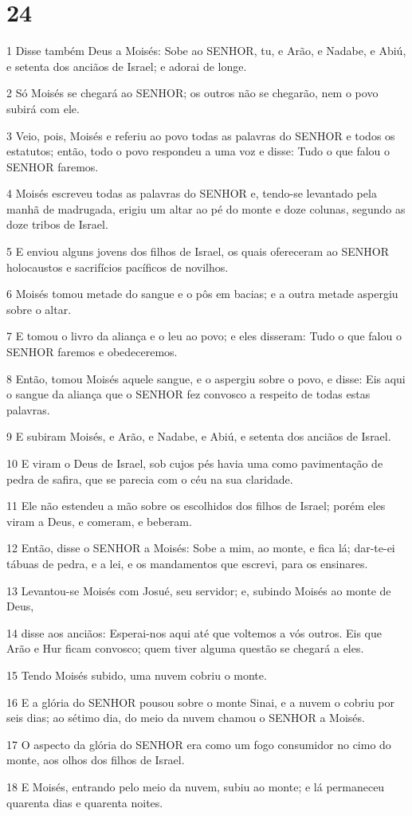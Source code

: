 \chapter{24}

\par 1 Disse também Deus a Moisés: Sobe ao SENHOR, tu, e Arão, e Nadabe, e Abiú, e setenta dos anciãos de Israel; e adorai de longe.
\par 2 Só Moisés se chegará ao SENHOR; os outros não se chegarão, nem o povo subirá com ele.
\par 3 Veio, pois, Moisés e referiu ao povo todas as palavras do SENHOR e todos os estatutos; então, todo o povo respondeu a uma voz e disse: Tudo o que falou o SENHOR faremos.
\par 4 Moisés escreveu todas as palavras do SENHOR e, tendo-se levantado pela manhã de madrugada, erigiu um altar ao pé do monte e doze colunas, segundo as doze tribos de Israel.
\par 5 E enviou alguns jovens dos filhos de Israel, os quais ofereceram ao SENHOR holocaustos e sacrifícios pacíficos de novilhos.
\par 6 Moisés tomou metade do sangue e o pôs em bacias; e a outra metade aspergiu sobre o altar.
\par 7 E tomou o livro da aliança e o leu ao povo; e eles disseram: Tudo o que falou o SENHOR faremos e obedeceremos.
\par 8 Então, tomou Moisés aquele sangue, e o aspergiu sobre o povo, e disse: Eis aqui o sangue da aliança que o SENHOR fez convosco a respeito de todas estas palavras.
\par 9 E subiram Moisés, e Arão, e Nadabe, e Abiú, e setenta dos anciãos de Israel.
\par 10 E viram o Deus de Israel, sob cujos pés havia uma como pavimentação de pedra de safira, que se parecia com o céu na sua claridade.
\par 11 Ele não estendeu a mão sobre os escolhidos dos filhos de Israel; porém eles viram a Deus, e comeram, e beberam.
\par 12 Então, disse o SENHOR a Moisés: Sobe a mim, ao monte, e fica lá; dar-te-ei tábuas de pedra, e a lei, e os mandamentos que escrevi, para os ensinares.
\par 13 Levantou-se Moisés com Josué, seu servidor; e, subindo Moisés ao monte de Deus,
\par 14 disse aos anciãos: Esperai-nos aqui até que voltemos a vós outros. Eis que Arão e Hur ficam convosco; quem tiver alguma questão se chegará a eles.
\par 15 Tendo Moisés subido, uma nuvem cobriu o monte.
\par 16 E a glória do SENHOR pousou sobre o monte Sinai, e a nuvem o cobriu por seis dias; ao sétimo dia, do meio da nuvem chamou o SENHOR a Moisés.
\par 17 O aspecto da glória do SENHOR era como um fogo consumidor no cimo do monte, aos olhos dos filhos de Israel.
\par 18 E Moisés, entrando pelo meio da nuvem, subiu ao monte; e lá permaneceu quarenta dias e quarenta noites.

